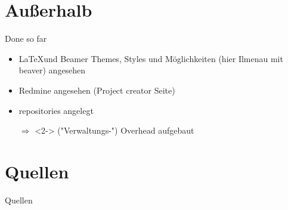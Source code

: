 \documentclass{beamer}
\begin{document}
\section{Außerhalb}
\begin{frame}{Done so far}
\begin{itemize}
	\item \LaTeX und Beamer Themes, Styles und Möglichkeiten (hier Ilmenau mit beaver) angesehen
	\item Redmine angesehen (Project creator Seite)
	\item repositories angelegt
	\item[$\Rightarrow$]<2-> ("Verwaltungs-") Overhead aufgebaut
\end{itemize}
\end{frame}

\section{Quellen}
\begin{frame}[shrink=10]{Quellen}
\nocite{*}

 
\end{frame}
\end{document}
